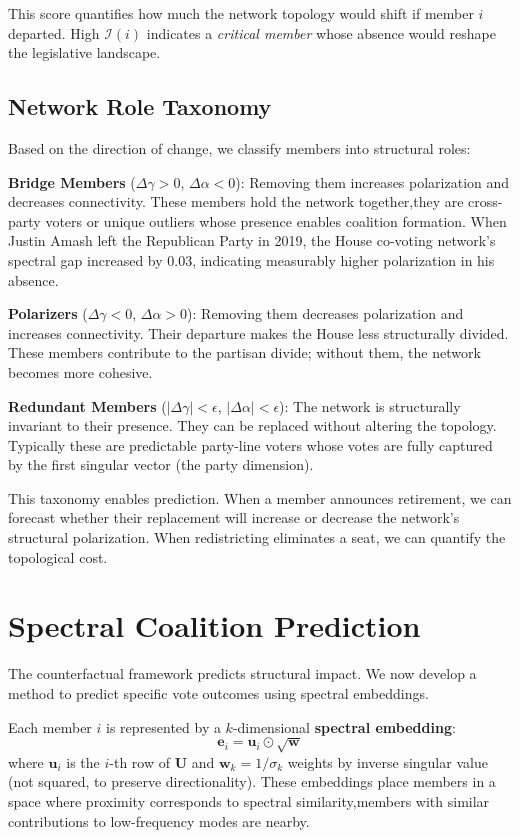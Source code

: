 \documentclass[11pt,a4paper]{article}
\begin{document}
This score quantifies how much the network topology would shift if member $i$ departed. High $\mathcal{I}(i)$ indicates a \textit{critical member} whose absence would reshape the legislative landscape.

\subsection{Network Role Taxonomy}

Based on the direction of change, we classify members into structural roles:

\textbf{Bridge Members} ($\Delta \gamma > 0$, $\Delta \alpha < 0$): Removing them increases polarization and decreases connectivity. These members hold the network together,they are cross-party voters or unique outliers whose presence enables coalition formation. When Justin Amash left the Republican Party in 2019, the House co-voting network's spectral gap increased by 0.03, indicating measurably higher polarization in his absence.

\textbf{Polarizers} ($\Delta \gamma < 0$, $\Delta \alpha > 0$): Removing them decreases polarization and increases connectivity. Their departure makes the House less structurally divided. These members contribute to the partisan divide; without them, the network becomes more cohesive.

\textbf{Redundant Members} ($|\Delta \gamma| < \epsilon$, $|\Delta \alpha| < \epsilon$): The network is structurally invariant to their presence. They can be replaced without altering the topology. Typically these are predictable party-line voters whose votes are fully captured by the first singular vector (the party dimension).

This taxonomy enables prediction. When a member announces retirement, we can forecast whether their replacement will increase or decrease the network's structural polarization. When redistricting eliminates a seat, we can quantify the topological cost.

\section{Spectral Coalition Prediction}

The counterfactual framework predicts structural impact. We now develop a method to predict specific vote outcomes using spectral embeddings.

Each member $i$ is represented by a $k$-dimensional \textbf{spectral embedding}:
\begin{equation}
\mathbf{e}_i = \mathbf{u}_i \odot \sqrt{\mathbf{w}}
\end{equation}
where $\mathbf{u}_i$ is the $i$-th row of $\mathbf{U}$ and $\mathbf{w}_k = 1/\sigma_k$ weights by inverse singular value (not squared, to preserve directionality). These embeddings place members in a space where proximity corresponds to spectral similarity,members with similar contributions to low-frequency modes are nearby.
\end{document}
